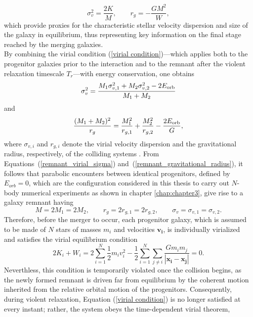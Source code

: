 \documentclass[12pt,twoside,openany]{book}
\begin{document}
\begin{equation}
\sigma_v^2=\frac{2K}{M}, \qquad r_g=-\frac{GM^2}{W},
\end{equation}
which provide proxies for the characteristic stellar velocity dispersion and size of the galaxy in equilibrium, thus representing key information on the final stage reached by the merging galaxies.\\By combining the virial condition (\ref{virial condition})—which applies both to the progenitor galaxies prior to the interaction and to the remnant after the violent relaxation timescale $T_r$—with energy conservation, one obtains
\begin{equation}\label{remnant_virial_sigma}
\sigma_v^2=\frac{M_1\sigma_{v,1}^2+M_2\sigma_{v,2}^2-2E_{\rm orb}}{M_1+M_2}
\end{equation}
and
\begin{equation}\label{remnant_gravitational_radius}
\frac{(M_1+M_2)^2}{r_g}=\frac{M_1^2}{r_{g,1}}+\frac{M_2^2}{r_{g,2}}-\frac{2E_{\rm orb}}{G},
\end{equation}
where $\sigma_{v,i}$ and $r_{g,i}$ denote the virial velocity dispersion and the gravitational radius, respectively, of the colliding systems \parencite{Cimatti_book}. From Equations~(\ref{remnant_virial_sigma}) and~(\ref{remnant_gravitational_radius}), it follows that parabolic encounters between identical progenitors, defined by $E_{orb}=0$, which are the configuration considered in this thesis to carry out $N$-body numerical experiments as shown in chapter \ref{chap:chapter3}, give rise to a galaxy remnant having
\begin{equation}
M=2M_1=2M_2, \qquad r_g=2r_{g,1}=2r_{g,2}, \qquad \sigma_v=\sigma_{v,1}=\sigma_{v,2}.
\end{equation}
Therefore, before the merger to occur, each progenitor galaxy, which is assumed to be made of $N$ stars of masses $m_i$ and velocities $\mathbf{v_i}$, is individually virialized and satisfies the virial equilibrium condition
\begin{equation}
 2K_i+W_i=2\sum_{i=1}^{N} \frac{1}{2} m_i v_i^2-\frac{1}{2} \sum_{i=1}^{N} \sum_{j \ne i} \frac{Gm_i m_j}{|\mathbf{x_i}-\mathbf{x_j}|}=0.
\label{extended virial condition}
\end{equation}
Neverthless, this condition is temporarily violated once the collision begins, as the newly formed remnant is driven far from equilibrium by the coherent motion inherited from the relative orbital motion of the progenitors. Consequently, during violent relaxation, Equation (\ref{virial condition}) is no longer satisfied at every instant; rather, the system obeys the time-dependent virial theorem,
\end{document}
